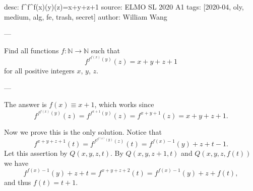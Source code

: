 desc: f^{f^{f(x)}(y)}(z)=x+y+z+1
source: ELMO SL 2020 A1
tags: [2020-04, oly, medium, alg, fe, trash, secret]
author: William Wang

---

Find all functions $f:\mathbb N\to\mathbb N$ such that \[f^{f^{f(x)}(y)}(z)=x+y+z+1\]
for all positive integers $x$, $y$, $z$.

---

The answer is $f(x)\equiv x+1$, which works since \[f^{f^{f(x)}(y)}(z)=f^{f^{x+1}(y)}(z)=f^{x+y+1}(z)=x+y+z+1.\]

Now we prove this is the only solution. Notice that \[f^{x+y+z+1}(t)=f^{f^{f^{f(x)}(y)}(z)}(t)=f^{f(x)-1}(y)+z+t-1.\]
Let this assertion by $Q(x,y,z,t)$. By $Q(x,y,z+1,t)$ and $Q(x,y,z,f(t))$ we have \[f^{f(x)-1}(y)+z+t=f^{x+y+z+2}(t)=f^{f(x)-1}(y)+z+f(t),\]
and thus $f(t)=t+1$.
